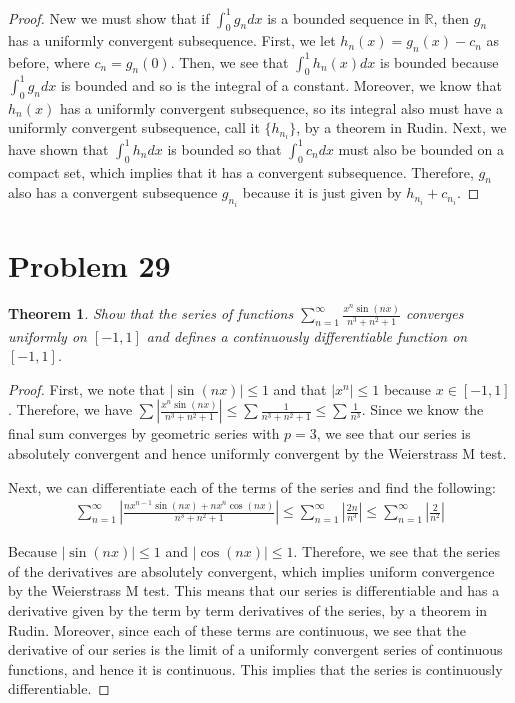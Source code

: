 \documentclass[psamsfonts]{amsart}
\newtheorem{thm}{Theorem}[section]
\theoremstyle{definition}
\theoremstyle{remark}
\numberwithin{equation}{section}
\begin{document}
\begin{proof}
New we must show that if $\int_0^1 g_n dx$ is a bounded sequence in $\mathbb{R}$, then $g_n$ has a uniformly convergent subsequence. First, we let $h_n(x) = g_n(x) - c_n$ as before, where $c_n = g_n(0)$. Then, we see that $\int_0^1 h_n(x) dx$ is bounded because $\int_0^1 g_n dx$ is bounded and so is the integral of a constant. Moreover, we know that $h_n(x)$ has a uniformly convergent subsequence, so its integral also must have a uniformly convergent subsequence, call it $\{ h_{n_i} \}$, by a theorem in Rudin. Next, we have shown that $\int_0^1 h_n dx$ is bounded so that $\int_0^1 c_n dx$ must also be bounded on a compact set, which implies that it has a convergent subsequence. Therefore, $g_n$ also has a convergent subsequence $g_{n_i}$ because it is just given by $h_{n_i} + c_{n_i}$.  
\end{proof}

\section{Problem 29}

\begin{thm}
Show that the series of functions $\sum_{n=1}^\infty \frac{x^n \sin(nx)}{n^3 + n^2 + 1}$ converges uniformly on $[-1,1]$ and defines a continuously differentiable function on $[-1,1]$.
\end{thm}

\begin{proof}
First, we note that $|\sin(nx)| \leq 1$ and that $|x^n | \leq 1$ because $x \in [-1,1]$. Therefore, we have $\sum \left| \frac{x^n \sin(nx)}{n^3 + n^2 + 1} \right| \leq \sum \frac{1}{n^3 + n^2 +1} \leq \sum \frac{1}{n^3}$. Since we know the final sum converges by geometric series with $p = 3$, we see that our series is absolutely convergent and hence uniformly convergent by the Weierstrass M test.  

Next, we can differentiate each of the terms of the series and find the following:
\begin{eqnarray}
\sum_{n=1}^\infty \left| \frac{ n x^{n-1} \sin(nx) + n x^n \cos(nx)}{n^3 + n^2 + 1} \right| \leq \sum_{n=1}^\infty \left| \frac{2n}{n^3} \right| \leq \sum_{n=1}^\infty \left| \frac{2}{n^2} \right|
\end{eqnarray}

Because $|\sin(nx)| \leq 1$ and $| \cos(nx) | \leq 1$. Therefore, we see that the series of the derivatives are absolutely convergent, which implies uniform convergence by the Weierstrass M test. This means that our series is differentiable and has a derivative given by the term by term derivatives of the series, by a theorem in Rudin. Moreover, since each of these terms are continuous, we see that the derivative of our series is the limit of a uniformly convergent series of continuous functions, and hence it is continuous. This implies that the series is continuously differentiable.
\end{proof}
\end{document}
